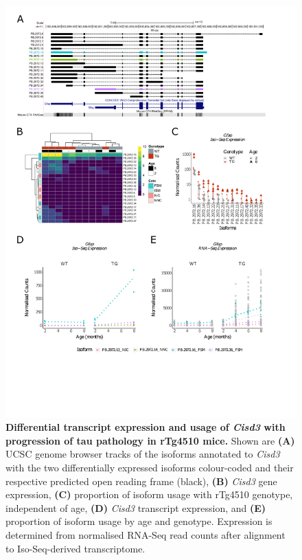 \newpage
\begin{figure}[!htp]
	\centering
	\includegraphics[page=4,trim={1.5cm 3.5cm 2cm 1cm}, scale = 0.80]{Figures/Ch5_DiffPlots.pdf}
	\captionsetup{width=0.95\textwidth}
	\caption[Differential \textit{Cisd3} transcript expression and usage]%
	{\textbf{Differential transcript expression and usage of \textit{Cisd3} with progression of tau pathology in rTg4510 mice.} Shown are \textbf{(A)} UCSC genome browser tracks of the isoforms annotated to \textit{Cisd3} with the two differentially expressed isoforms colour-coded and their respective predicted open reading frame (black), \textbf{(B)} \textit{Cisd3} gene expression, \textbf{(C)} proportion of isoform usage with rTg4510 genotype, independent of age, \textbf{(D)} \textit{Cisd3} transcript expression, and \textbf{(E)} proportion of isoform usage by age and genotype. Expression is determined from normalised RNA-Seq read counts after alignment to Iso-Seq-derived transcriptome.}    
	\label{fig:DIU_Cisd3}
\end{figure}

